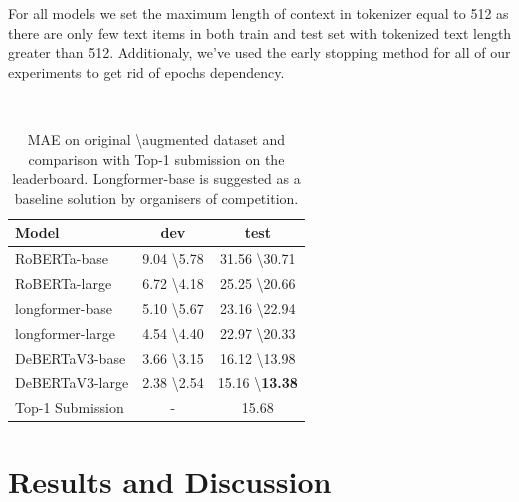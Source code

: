 \documentclass[11pt]{article}
\begin{document}
        For all models we set the maximum length of context in tokenizer equal to 512 as there are only few text items in both train and test set with tokenized text length greater than 512. Additionaly, we've used the early stopping method for all of our experiments to get rid of epochs dependency.
        
~ 

\begin{table}[t!]
\centering
\begin{tabular}{lcc}
\textbf{Model} & \textbf{dev} & \textbf{test} \\
\hline
RoBERTa-base & 9.04 \textbackslash\hspace{0.25em}5.78 & 31.56 \textbackslash\hspace{0.25em}30.71\\
RoBERTa-large & 6.72 \textbackslash\hspace{0.25em}4.18 & 25.25 \textbackslash\hspace{0.25em}20.66\\
\hline
longformer-base  & 5.10 \textbackslash\hspace{0.25em}5.67 & 23.16 \textbackslash\hspace{0.25em}22.94 \\
longformer-large  & 4.54 \textbackslash\hspace{0.25em}4.40 & 22.97 \textbackslash\hspace{0.25em}20.33 \\
\hline
DeBERTaV3-base & 3.66 \textbackslash\hspace{0.25em}3.15  & 16.12 \textbackslash\hspace{0.25em}13.98 \\
DeBERTaV3-large & 2.38 \textbackslash\hspace{0.25em}2.54 & 15.16 \textbackslash\hspace{0.25em}\textbf{13.38} \\
\hline
Top-1 Submission & - & 15.68
\end{tabular}
\caption{MAE on original \textbackslash\hspace{0.25em}augmented dataset and comparison with Top-1 submission on the leaderboard. Longformer-base is suggested as a baseline solution by organisers of competition.} 
\label{tab:mae}
\end{table}


\section{Results and Discussion}
\end{document}
